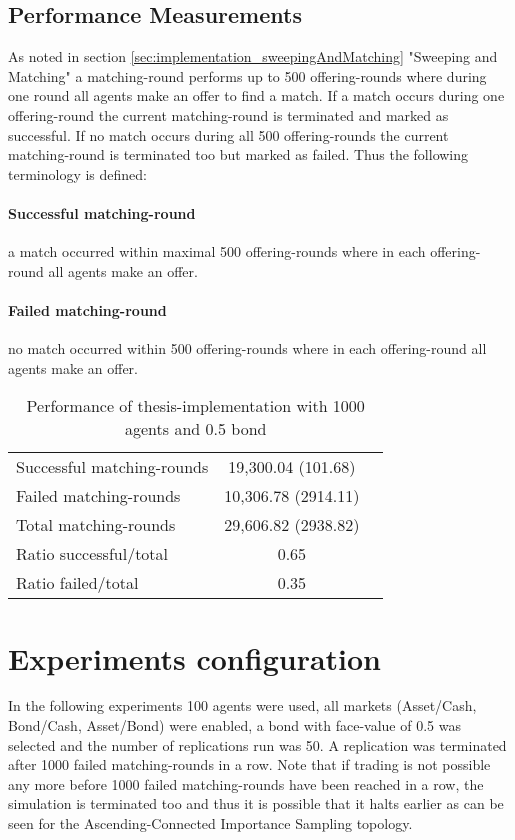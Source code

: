\documentclass[Bachelorarbeit.tex]{subfiles}
\begin{document}
\subsection{Performance Measurements}
As noted in section \ref{sec:implementation_sweepingAndMatching} "Sweeping and Matching" a matching-round performs up to 500 offering-rounds where during one round all agents make an offer to find a match. If a match occurs during one offering-round the current matching-round is terminated and marked as successful. If no match occurs during all 500 offering-rounds the current matching-round is terminated too but marked as failed. Thus the following terminology is defined:

\paragraph{Successful matching-round} a match occurred within maximal 500 offering-rounds where in each offering-round all agents make an offer.
\paragraph{Failed matching-round} no match occurred within 500 offering-rounds where in each offering-round all agents make an offer.

\begin{table}[H]
	\centering
	\caption{Performance of thesis-implementation with 1000 agents and 0.5 bond}
	\begin{tabular} { l c r }
		\hline
		Successful matching-rounds & 19,300.04 (101.68) \\
		Failed matching-rounds & 10,306.78 (2914.11) \\
		Total matching-rounds & 29,606.82 (2938.82) \\
		\hline
		Ratio successful/total & 0.65 \\
		Ratio failed/total & 0.35 \\
		\hline
	\end{tabular}
\end{table}


\section{Experiments configuration}
In the following experiments 100 agents were used, all markets (Asset/Cash, Bond/Cash, Asset/Bond) were enabled, a bond with face-value of 0.5 was selected and the number of replications run was 50. A replication was terminated after 1000 failed matching-rounds in a row. Note that if trading is not possible any more before 1000 failed matching-rounds have been reached in a row, the simulation is terminated too and thus it is possible that it halts earlier as can be seen for the Ascending-Connected Importance Sampling topology.
\end{document}
